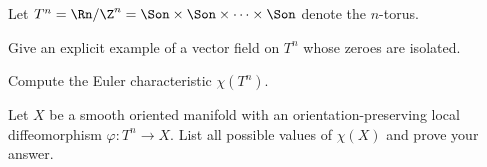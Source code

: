 Let $T^n=\Rn/\Z^n=\Son\times \Son \times \cdots \times \Son$ denote the
$n$-torus.
\begin{alist}
\item
\begin{rlist}
\item Give an explicit example of a vector field on $T^n$ whose zeroes
are isolated.
\item Compute the Euler characteristic $\chi(T^n)$.
\end{rlist}
\item Let $X$ be a smooth oriented manifold with an
orientation-preserving local diffeomorphism $\varphi:T^n\rightarrow
X$. List all possible values of $\chi(X)$ and prove your answer.
\end{alist}

